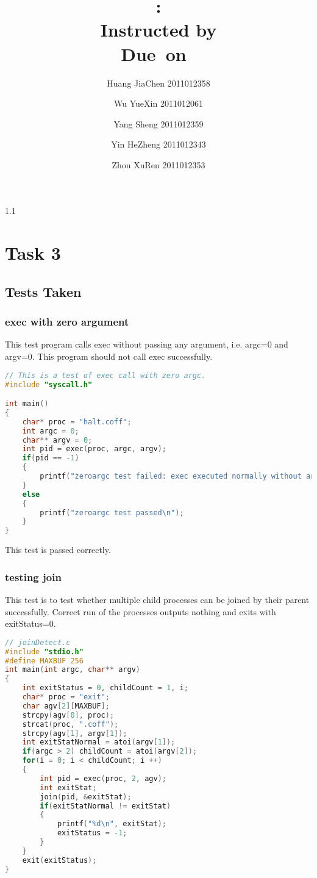 \documentclass{article}
\title{\textmd{\bf \Class: \Title}\\{\large Instructed by \textit{\ClassInstructor}}\\\normalsize\vspace{0.1in}\small{Due\ on\ \DueDate}}
\date{}
\author{%
  Huang JiaChen 2011012358 \and
  Wu YueXin 2011012061 \and
  Yang Sheng 2011012359 \and
  Yin HeZheng 2011012343 \and
  Zhou XuRen 2011012353}
\begin{document}
  \begin{spacing}{1.1}
    \maketitle \thispagestyle{empty}



\section{Task 3}
\subsection{Tests Taken}
\subsubsection{\textsf{exec} with zero argument}
This test program calls \textsf{exec} without passing any argument, i.e. \textsf{argc}=0 and \textsf{argv}=0. This program should not call \textsf{exec} successfully.
\begin{lstlisting}[language=C]
// This is a test of exec call with zero argc.
#include "syscall.h"

int main()
{
    char* proc = "halt.coff";
    int argc = 0;
    char** argv = 0;
    int pid = exec(proc, argc, argv);
    if(pid == -1)
    {
        printf("zeroargc test failed: exec executed normally without argc\n");
    }
    else
    {
        printf("zeroargc test passed\n");
    }
}
\end{lstlisting}
This test is passed correctly.
\subsubsection{testing \textsf{join}}
This test is to test whether multiple child processes can be joined by their parent successfully. Correct run of the processes outputs nothing and exits with \textsf{exitStatus}=0.
\begin{lstlisting}[language=C]
// joinDetect.c
#include "stdio.h"
#define MAXBUF 256
int main(int argc, char** argv)
{
    int exitStatus = 0, childCount = 1, i;
    char* proc = "exit";
    char agv[2][MAXBUF];
    strcpy(agv[0], proc);
    strcat(proc, ".coff");
    strcpy(agv[1], argv[1]);
    int exitStatNormal = atoi(argv[1]);
    if(argc > 2) childCount = atoi(argv[2]);
    for(i = 0; i < childCount; i ++)
    {
        int pid = exec(proc, 2, agv);
        int exitStat;
        join(pid, &exitStat);
        if(exitStatNormal != exitStat)
        {
            printf("%d\n", exitStat);
            exitStatus = -1;
        }
    }
    exit(exitStatus);
}


\end{lstlisting}
\end{spacing}
\end{document}
